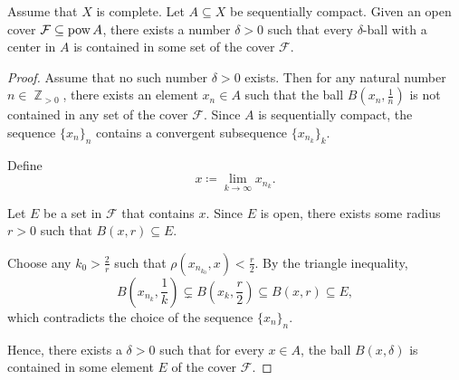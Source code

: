 \begin{lemma}\label{thm:lebesgues_covering_lemma}
  Assume that \( X \) is complete. Let \( A \subseteq X \) be sequentially compact. Given an open cover \( \mathcal{F} \subseteq \operatorname{pow} A \), there exists a number \( \delta > 0 \) such that every \( \delta \)-ball with a center in \( A \) is contained in some set of the cover \( \mathcal{F} \).
\end{lemma}
\begin{proof}
  Assume that no such number \( \delta > 0 \) exists. Then for any natural number \( n \in \BbbZ_{>0} \), there exists an element \( x_n \in A \) such that the ball \( B(x_n, \frac 1 n) \) is not contained in any set of the cover \( \mathcal{F} \). Since \( A \) is sequentially compact, the sequence \( \{ x_n \}_n \) contains a convergent subsequence \( \{ x_{n_k} \}_k \).

  Define
  \begin{equation*}
    x \coloneqq \lim_{k \to \infty} x_{n_k}.
  \end{equation*}

  Let \( E \) be a set in \( \mathcal{F} \) that contains \( x \). Since \( E \) is open, there exists some radius \( r > 0 \) such that \( B(x, r) \subseteq E \).

  Choose any \( k_0 > \frac 2 r \) such that \( \rho(x_{n_{k_0}}, x) < \frac r 2 \). By the triangle inequality,
  \begin{equation*}
    B \left(x_{n_k}, \frac 1 k \right) \subsetneq B \left(x_k, \frac r 2 \right) \subseteq B(x, r) \subseteq E,
  \end{equation*}
  which contradicts the choice of the sequence \( \{ x_n \}_n \).

  Hence, there exists a \( \delta > 0 \) such that for every \( x \in A \), the ball \( B(x, \delta) \) is contained in some element \( E \) of the cover \( \mathcal{F} \).
\end{proof}

